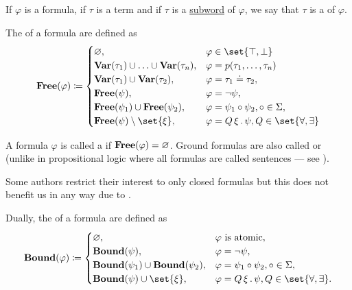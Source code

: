 \begin{definition}
\begin{thmenum}
     If \( \varphi \) is a formula, if \( \tau \) is a term and if \( \tau \) is a \hyperref[def:language/subword]{subword} of \( \varphi \), we say that \( \tau \) is a  of \( \varphi \).

     The  of a formula are defined as
    \begin{equation}\label{eq:def:first_order_syntax/formula_free_variables}
      \boldop{Free}(\varphi) \coloneqq \begin{cases}
        \varnothing,                                                &\varphi \in \set{ \top, \bot } \\
        \boldop{Var}(\tau_1) \cup \ldots \cup \boldop{Var}(\tau_n), &\varphi = p(\tau_1, \ldots, \tau_n) \\
        \boldop{Var}(\tau_1) \cup \boldop{Var}(\tau_2),             &\varphi = \tau_1 \doteq \tau_2, \\
        \boldop{Free}(\psi),                                        &\varphi = \neg \psi, \\
        \boldop{Free}(\psi_1) \cup \boldop{Free}(\psi_2),           &\varphi = \psi_1 \bincirc \psi_2, \bincirc \in \Sigma, \\
        \boldop{Free}(\psi) \setminus \set{ \xi },                  &\varphi = \quantifier{Q}{\xi} \psi, Q \in \set{ \forall, \exists }
      \end{cases}
    \end{equation}

     A formula \( \varphi \) is called a  if \( \operatorname{\mathbf{Free}}(\varphi) = \varnothing \). Ground formulas are also called  or  (unlike in propositional logic where all formulas are called sentences --- see ).

    Some authors restrict their interest to only closed formulas but this does not benefit us in any way due to .

     Dually, the  of a formula are defined as
    \begin{equation}\label{eq:def:first_order_syntax/formula_bound_variables}
      \boldop{Bound}(\varphi) \coloneqq \begin{cases}
        \varnothing,                                        &\varphi \text{ is atomic}, \\
        \boldop{Bound}(\psi),                               &\varphi = \neg \psi, \\
        \boldop{Bound}(\psi_1) \cup \boldop{Bound}(\psi_2), &\varphi = \psi_1 \bincirc \psi_2, \bincirc \in \Sigma, \\
        \boldop{Bound}(\psi) \cup \set{ \xi },              &\varphi = \quantifier{Q}{\xi} \psi, Q \in \set{ \forall, \exists }.
      \end{cases}
    \end{equation}


\end{thmenum}
\end{definition}
